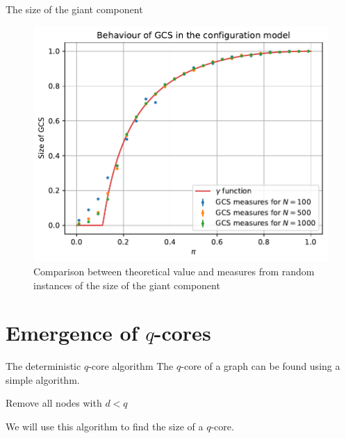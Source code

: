 \documentclass[handout]{beamer}
\begin{document}
\begin{frame}{The size of the giant component}
    \begin{figure}
        \centering
        \includegraphics[height=.7\textheight]{gcs}
        \caption{Comparison between theoretical value and measures from random
        instances of the size of the giant component}
        \label{fig:gcs}
    \end{figure}
\end{frame}

\section{Emergence of $q$-cores}

\begin{frame}{The deterministic $q$-core algorithm}
    The $q$-core of a graph can be found using a simple algorithm.

    \begin{algorithm}[H]
        \begin{algorithmic}[1]
                \STATE Remove all nodes with $d<q$
            \ENDWHILE
        \end{algorithmic}
        \caption{Algorithm for deterministic $q$-core detection}
        \label{algo:qcore_det}
    \end{algorithm}

    We will use this algorithm to find the size of a $q$-core.
\end{frame}
\end{document}
